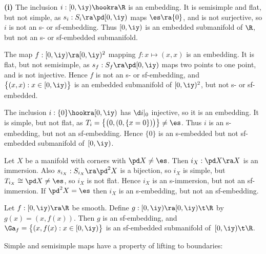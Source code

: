\documentclass{article}
\begin{document}
\begin{ex}{\bf(i)} The inclusion $i:[0,\iy)\hookra\R$ is an
embedding. It is semisimple and flat, but not simple, as
$s_i:S_i\ra\pd[0,\iy)$ maps $\es\ra\{0\}$, and is not surjective, so
$i$ is not an s- or sf-embedding. Thus $[0,\iy)$ is an embedded
submanifold of $\R$, but not an s- or sf-embedded submanifold.

\smallskip

 The map $f:[0,\iy)\ra[0,\iy)^2$ mapping
$f:x\mapsto(x,x)$ is an embedding. It is flat, but not semisimple,
as $s_f:S_f\ra\pd[0,\iy)$ maps two points to one point, and is not
injective. Hence $f$ is not an s- or sf-embedding, and
$\bigl\{(x,x):x\in[0,\iy)\bigr\}$ is an embedded submanifold of
$[0,\iy)^2$, but not s- or sf-embedded.

\smallskip

 The inclusion $i:\{0\}\hookra[0,\iy)$ has $\d
i\vert_0$ injective, so it is an embedding. It is simple, but not
flat, as $T_i=\bigl\{\bigl(0,(0,\{x=0\})\bigr)\bigr\} \ne\es$. Thus
$i$ is an s-embedding, but not an sf-embedding. Hence $\{0\}$ is an
s-embedded but not sf-embedded submanifold of~$[0,\iy)$.

\smallskip

 Let $X$ be a manifold with corners with $\pd
X\ne\es$. Then $i_X:\pd X\ra X$ is an immersion. Also
$s_{i_X}:S_{i_X}\ra\pd^2X$ is a bijection, so $i_X$ is simple,  but
$T_{i_X}\cong\pd X\ne\es$, so $i_X$ is not flat. Hence $i_X$ is an
s-immersion, but not an sf-immersion. If $\pd^2X=\es$ then $i_X$ is
an s-embedding, but not an sf-embedding.

\smallskip

 Let $f:[0,\iy)\ra\R$ be smooth. Define
$g:[0,\iy)\ra[0,\iy)\t\R$ by $g(x)=(x,f(x))$. Then $g$ is an
sf-embedding, and $\Ga_f=\bigl\{(x,f(x):x\in[0,\iy)\bigr\}$ is an
sf-embedded submanifold of~$[0,\iy)\t\R$.
\label{ds5ex2}
\end{ex}

Simple and semisimple maps have a property of lifting to boundaries:
\end{document}
